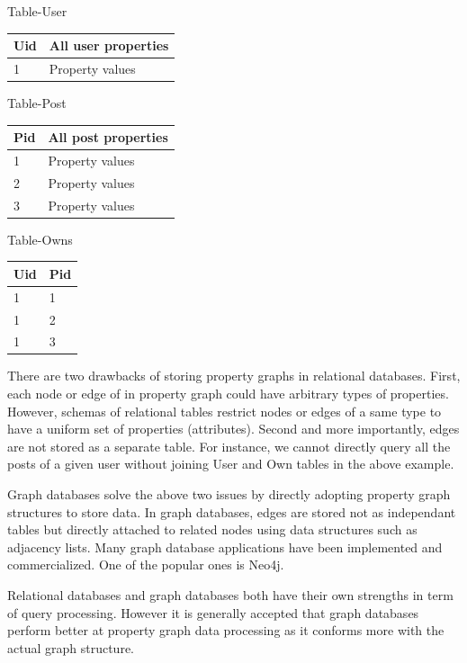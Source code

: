Table-User
\begin{center}
\begin{tabular}{ l | l }  
	Uid	&{All user properties}	\\ \hline 
	1	&{Property values} \\
\end{tabular}
\end {center}

Table-Post
\begin{center}
	\begin{tabular}{ l | l }  
		Pid	& {All post properties}	\\ \hline 
		1	&{Property values} \\
		2	&{Property values} \\
		3	&{Property values} \\
	\end{tabular}
	\end {center}	
 
Table-Owns
\begin{center}
	\begin{tabular}{ l | l }  
		Uid	& Pid	\\ \hline 
		1	&1 \\
		1	&2 \\
		1	&3 \\
	\end{tabular}
	\end {center}

 
There are two drawbacks of storing property graphs in relational databases. First, each node or edge of in property graph could have arbitrary types of properties. However, schemas of relational tables restrict nodes or edges of a same type to have a uniform set of properties (attributes). Second and more importantly, edges are not stored as a separate table. For instance, we cannot directly query all the posts of a given user without joining User and Own tables in the above example.
 
Graph databases solve the above two issues by directly adopting property graph structures to store data. In graph databases, edges are stored not as independant tables but directly attached to related nodes using data structures such as adjacency lists. Many graph database applications have been implemented and commercialized. One of the popular ones is Neo4j.
 
Relational databases and graph databases both have their own strengths in term of query processing. However it is generally accepted that graph databases perform better at property graph data processing as it conforms more with the actual graph structure. 

